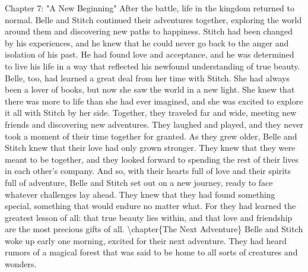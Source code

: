 \documentclass{book}%
\begin{document}
Chapter 7: "A New Beginning"\newline%
\newline%
After the battle, life in the kingdom returned to normal. Belle and Stitch continued their adventures together, exploring the world around them and discovering new paths to happiness.\newline%
\newline%
Stitch had been changed by his experiences, and he knew that he could never go back to the anger and isolation of his past. He had found love and acceptance, and he was determined to live his life in a way that reflected his newfound understanding of true beauty.\newline%
\newline%
Belle, too, had learned a great deal from her time with Stitch. She had always been a lover of books, but now she saw the world in a new light. She knew that there was more to life than she had ever imagined, and she was excited to explore it all with Stitch by her side.\newline%
\newline%
Together, they traveled far and wide, meeting new friends and discovering new adventures. They laughed and played, and they never took a moment of their time together for granted.\newline%
\newline%
As they grew older, Belle and Stitch knew that their love had only grown stronger. They knew that they were meant to be together, and they looked forward to spending the rest of their lives in each other's company.\newline%
\newline%
And so, with their hearts full of love and their spirits full of adventure, Belle and Stitch set out on a new journey, ready to face whatever challenges lay ahead. They knew that they had found something special, something that would endure no matter what.\newline%
\newline%
For they had learned the greatest lesson of all: that true beauty lies within, and that love and friendship are the most precious gifts of all.%
\textbackslash{}chapter\{The Next Adventure\}\newline%
\newline%
Belle and Stitch woke up early one morning, excited for their next adventure. They had heard rumors of a magical forest that was said to be home to all sorts of creatures and wonders.\newline%
\end{document}
